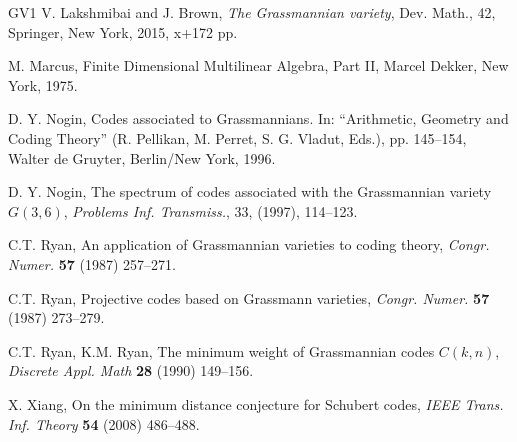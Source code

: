 \documentclass[10pt,a4paper,oneside]{amsproc}
\begin{document}
\begin{thebibliography}{GV1}
V. Lakshmibai and J. Brown,
\textit{The Grassmannian variety},
Dev. Math., 42, 
Springer, New York, 2015, x+172 pp.

M. Marcus, Finite Dimensional Multilinear Algebra, Part II, Marcel Dekker, New York, 1975.

D. Y. Nogin,  
Codes associated to Grassmannians. In: “Arithmetic, Geometry and Coding Theory” 
(R. Pellikan, M. Perret, S. G. Vladut, Eds.), pp. 145–154, Walter de Gruyter, 
Berlin/New York, 1996.

D. Y. Nogin, The spectrum of codes associated with the Grassmannian variety $G(3, 6)$, \emph{Problems Inf. Transmiss.}, 33, (1997), 114–123.

C.T. Ryan, An application of Grassmannian varieties to coding theory, \emph{Congr. Numer.} {\bf 57} (1987) 257–271.

C.T. Ryan, Projective codes based on Grassmann varieties, \emph{Congr. Numer.} {\bf 57} (1987) 273–279. 

C.T. Ryan, K.M. Ryan, The minimum weight of Grassmannian codes $C(k,n)$, \emph{Discrete Appl. Math} {\bf 28} (1990) 149–156.



X. Xiang, On the minimum distance conjecture for Schubert codes, \emph{IEEE Trans. Inf. Theory} {\bf 54} (2008) 486–488. 

\end{thebibliography}
\end{document}
